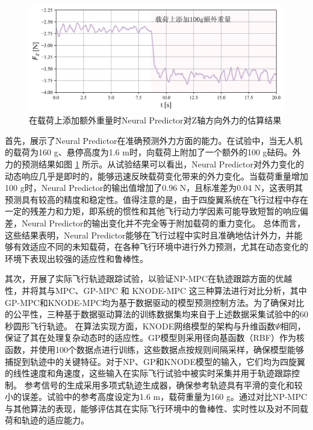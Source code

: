 \documentclass[lang=chs, degree=master, blindreview=false, winfonts=true]{yanputhesis}
\begin{document}
\begin{figure}[hbt!]
	\centering
	\includegraphics[width=34pc]{picture/kk/force.png} 
	\caption{在载荷上添加额外重量时Neural Predictor对Z轴方向外力的估算结果} 
	\label{force}
\end{figure}
首先，展示了Neural Predictor在准确预测外力方面的能力。在试验中，当无人机的载荷为160 g、悬停高度为1.6 m时，向载荷上附加了一个额外的100 g砝码。外力的预测结果如图 \ref{force} 所示。从试验结果可以看出，Neural Predictor对外力变化的动态响应几乎是即时的，能够迅速反映载荷变化带来的外力变化。当载荷重量增加100 g时，Neural Predictor的输出值增加了0.96 N，且标准差为0.04 N，这表明其预测具有较高的精度和稳定性。值得注意的是，由于四旋翼系统在飞行过程中存在一定的残差力和力矩，即系统的惯性和其他飞行动力学因素可能导致短暂的响应偏差，Neural Predictor的输出变化并不完全等于附加载荷的重力变化。
总体而言，这些结果表明，Neural Predictor能够在飞行过程中实时且准确地估计外力，并能够有效适应不同的未知载荷，在各种飞行环境中进行外力预测，尤其在动态变化的环境下表现出较强的适应性和鲁棒性。

其次，开展了实际飞行轨迹跟踪试验，以验证NP-MPC在轨迹跟踪方面的优越性，并将其与MPC、GP-MPC \cite{torrente2021data} 和 KNODE-MPC \cite{Chee2022} 这三种算法进行对比分析，其中GP-MPC和KNODE-MPC均为基于数据驱动的模型预测控制方法。为了确保对比的公平性，三种基于数据驱动算法的训练数据集均来自于上述数据采集试验中的60秒圆形飞行轨迹。
在算法实现方面，KNODE网络模型的架构与升维函数$\Psi$相同，保证了其在处理复杂动态时的适应性。GP模型则采用径向基函数（RBF）作为核函数，并使用100个数据点进行训练，这些数据点按规则间隔采样，确保模型能够捕捉到轨迹中的关键特征。对于NP、GP和KNODE模型的输入，它们均为四旋翼的线性速度和角速度，这些输入在实际飞行试验中被实时采集并用于轨迹跟踪控制。
参考信号的生成采用多项式轨迹生成器，确保参考轨迹具有平滑的变化和较小的误差。试验中的参考高度设定为1.6 m，载荷重量为160 g。通过对比NP-MPC与其他算法的表现，能够评估其在实际飞行环境中的鲁棒性、实时性以及对不同载荷和轨迹的适应能力。
\end{document}

